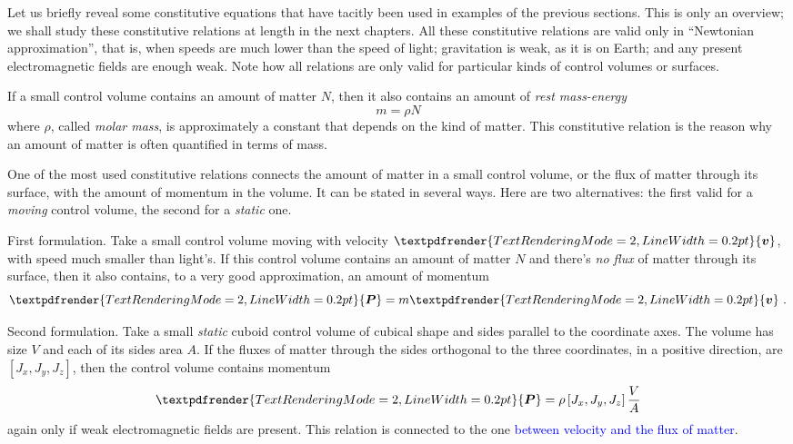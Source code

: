\documentclass[a4paper,12pt,%
onecolumn,oneside,%
british%
]{memoir}
\renewcommand*{\bm}[1]{\textpdfrender{TextRenderingMode=2,LineWidth=0.2pt}{\boldsymbol{#1}}}
\renewcommand*{\|}[1][]{\nonscript\:#1\vert\nonscript\:\mathopen{}}
\newcommand*{\sect}{\S}%
\renewcommand*{\autoref}[2]{\sidepar{\vspace{-1ex}\footnotesize{\color{blue}\faIcon{%
angle-right%
}\enskip\sect~\ref{#1} page~\pageref{#1}}}\textcolor{blue}{#2}}
\newcommand*{\masse}{mass-energy}
\newcommand*{\yv}{\bm{v}}
\newcommand*{\yN}{N}
\newcommand*{\yrho}{\rho}
\newcommand*{\ym}{m}%
\newcommand*{\yP}{\bm{P}}
\begin{document}
Let us briefly reveal some constitutive equations that have tacitly been used in examples of the previous sections. This is only an overview; we shall study these constitutive relations at length in the next chapters. All these constitutive relations are valid only in \enquote{Newtonian approximation}, that is, when speeds are much lower than the speed of light; gravitation is weak, as it is on Earth; and any present electromagnetic fields are enough weak. Note how all relations are only valid for particular kinds of control volumes or surfaces.

\begin{description}[itemsep=1em,wide]
\item[Constitutive relation for \masse\ and matter.]
If a small control volume contains an amount of matter $\yN$, then it also contains an amount of \emph{rest \masse}
\begin{equation*}
\ym =  \yrho\yN
\end{equation*}
where $\yrho$, called \emph{molar mass}, is approximately a constant that depends on the kind of matter. This constitutive relation is the reason why an amount of matter is often quantified in terms of mass.

\item[Constitutive relation for momentum and matter.]\label{item:momentum_mass_velocity} One of the most used constitutive relations connects the amount of matter in a small control volume, or the flux of matter through its surface, with the amount of momentum in the volume. It can be stated in several ways. Here are two alternatives: the first valid for a \emph{moving} control volume, the second for a \emph{static} one.


  First formulation. Take a small control volume moving with velocity $\yv$, with speed much smaller than light's. If this control volume contains an amount of matter $\yN$ and there's \emph{no flux} of matter through its surface, then it also contains, to a very good approximation, an amount of momentum
\begin{equation*}
  \yP = \ym\yv \ .%
\end{equation*}
%
%

\vspace{-\baselineskip}
Second formulation. Take a small \emph{static} cuboid control volume of cubical shape and sides parallel to the coordinate axes. The volume has size $V$ and each of its sides area $A$. If the fluxes of matter through the sides orthogonal to the three coordinates, in a positive direction, are $[J_{x}, J_{y}, J_{z}]$, then the control volume contains momentum
\begin{equation*}
  \yP = \yrho\,[J_{x}, J_{y}, J_{z}]\,\frac{V}{A}
\end{equation*}
again only if weak electromagnetic fields are present. This relation is connected to the one \autoref{sec:fluxes_velocities}{between velocity and the flux of matter}.



\end{description}
\end{document}

